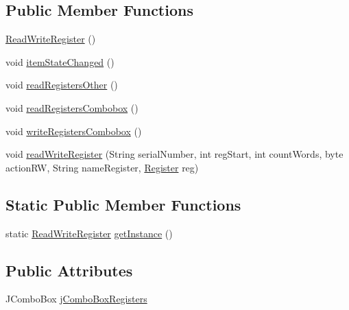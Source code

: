 \subsection*{Public Member Functions}
\begin{DoxyCompactItemize}
\item 
\hyperlink{classcom_1_1eneri_1_1scorpio__metertool_1_1ui_1_1_read_write_register_add225fb1e9bf512778f641e573af47c6}{Read\+Write\+Register} ()
\item 
void \hyperlink{classcom_1_1eneri_1_1scorpio__metertool_1_1ui_1_1_read_write_register_a6bc195b5eb3540c5cc9d63b27ccb65e5}{item\+State\+Changed} ()
\item 
void \hyperlink{classcom_1_1eneri_1_1scorpio__metertool_1_1ui_1_1_read_write_register_ae95818480dd12bb16f95ab2c994d22b8}{read\+Registers\+Other} ()
\item 
void \hyperlink{classcom_1_1eneri_1_1scorpio__metertool_1_1ui_1_1_read_write_register_a41b079932728f37b8c952fc70bae749e}{read\+Registers\+Combobox} ()
\item 
void \hyperlink{classcom_1_1eneri_1_1scorpio__metertool_1_1ui_1_1_read_write_register_af70416446fbf8c324e484f1e549a2047}{write\+Registers\+Combobox} ()
\item 
void \hyperlink{classcom_1_1eneri_1_1scorpio__metertool_1_1ui_1_1_read_write_register_ab65b719a7123d145104a00f8594a5293}{read\+Write\+Register} (String serial\+Number, int reg\+Start, int count\+Words, byte action\+RW, String name\+Register, \hyperlink{enumcom_1_1eneri_1_1scorpio__metertool_1_1devices_1_1_register}{Register} reg)
\end{DoxyCompactItemize}
\subsection*{Static Public Member Functions}
\begin{DoxyCompactItemize}
\item 
static \hyperlink{classcom_1_1eneri_1_1scorpio__metertool_1_1ui_1_1_read_write_register}{Read\+Write\+Register} \hyperlink{classcom_1_1eneri_1_1scorpio__metertool_1_1ui_1_1_read_write_register_ae7ae44ab09d77786ea1885440a0763d9}{get\+Instance} ()
\end{DoxyCompactItemize}
\subsection*{Public Attributes}
\begin{DoxyCompactItemize}
\item 
J\+Combo\+Box \hyperlink{classcom_1_1eneri_1_1scorpio__metertool_1_1ui_1_1_read_write_register_a0dd3201c686ca00979ee14beb3a28d47}{j\+Combo\+Box\+Registers}
\end{DoxyCompactItemize}


